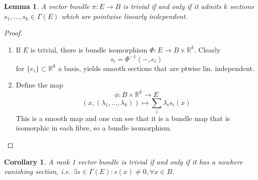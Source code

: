 \documentclass{article}
\numberwithin{theorem}{section}
\newtheorem{lemma}[theorem]{Lemma}
\newtheorem{definition}[theorem]{Definition}
\newtheorem{corollary}[theorem]{Corollary}
\newcommand{\R}{\mathbb{R}}
\newcommand{\1}{\mathds{1}}
\begin{document}
\begin{lemma}
    A vector bundle $\pi: E \to B$ is trivial if and only if it admits $k$ sections $s_1, \dots, s_k \in \Gamma(E)$ which are pointwise linearly independent. 
\end{lemma}
\begin{proof}
    \begin{enumerate}
        \item If $E$ is trivial, there is bundle isomorphism $\Phi: E \to B \times \R^k$. Clearly \[ s_i = \Phi^{-1}( - , e_i) \] for $\{ e_i \} \subset \R^k$ a basis, yields smooth sections that are ptwise lin. independent. 
        \item Define the map 
        \[ \phi: B \times \R^k \to E \]
        \[ (x, (\lambda_1, \dots, \lambda_k)) \mapsto \sum_i \lambda_i s_i(x) \]
        This is a smooth map and one can see that it is a bundle map that is isomorphic in each fibre, so a bundle isomorphism. 
    \end{enumerate}
\end{proof}

\begin{corollary}
    A rank 1 vector bundle is trivial if and only if it has a nowhere vanishing section, i.e. $\exists s \in \Gamma(E) : s(x) \neq 0, \forall x \in B$. 
\end{corollary}

\iffalse 
\begin{definition}
    A section of the cotangent bundle is an element $\omega \in \Gamma(T^*M)$. For any Vector field $X \in \Gamma(TM)$ it must hold that 
    \[ \omega(X) \in C^\infty(M)  \]
    Further since this is defined pointwise, and for any $f \in C^\infty(M)$, $fX \in \Gamma(TM)$ 
    \[ \forall p \in M: \omega(fX)(p) = \omega_p(f(p)X_p) = f(p)\omega_p(X_p)  = f\omega(X)(p)\]
    as $\omega_p \in (T_pM)^*$ and hence $\R$ linear. Independent of that we know that $\Gamma(TM)$ is a $C^\infty(M) $ module, and this gives a necessary condition on sections. I.e. It turns out that $(\Gamma(TM))^*$ is equivalent to $\Gamma(T^*M)$. In the former the elements eat vector fields and spit out $C^\infty(M)$ functions and are by definition $C^\infty(M)$-linear (since it is sort of the space of linear functionals, and linear with respect to the module $C^\infty(M)$). The latter is a smooth function that is pointwise on each fiber $\R$ linear but it turns out that these two agree. So the morale is: If one wants to check if $w \in \Gamma(T^*M)$ then check if $w \in (\Gamma(TM))^*$, i.e. check if $C^\infty(M)$ linear, instead of checking smoothness, which is far easier. 
\end{definition}
\fi 
\end{document}
